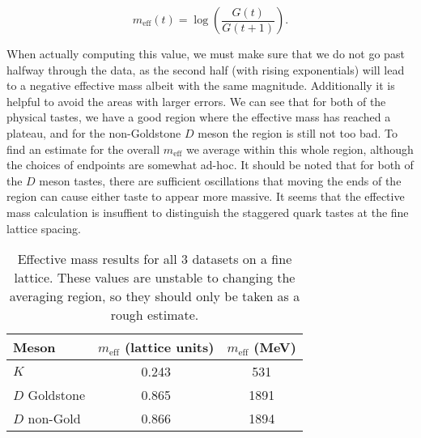 \documentclass[a4paper,12pt]{article}
\begin{document}
\begin{equation}
    \label{eq:meff}
    m_{\mathrm{eff}}(t) = \log(\frac{G(t)}{G(t+1)}).
\end{equation}

When actually computing this value, we must make sure that we do not go past halfway through the data, as the second half (with rising exponentials) will lead to a negative effective mass albeit with the same magnitude. Additionally it is helpful to avoid the areas with larger errors. We can see that for both of the physical tastes, we have a good region where the effective mass has reached a plateau, and for the non-Goldstone $D$ meson the region is still not too bad. To find an estimate for the overall $m_\mathrm{eff}$ we average within this whole region, although the choices of endpoints are somewhat ad-hoc. It should be noted that for both of the $D$ meson tastes, there are sufficient oscillations that moving the ends of the region can cause either taste to appear more massive. It seems that the effective mass calculation is insuffient to distinguish the staggered quark tastes at the fine lattice spacing.

\begin{figure}[!h]
\end{figure}

\begin{table}
\centering
\begin{tabular}{l S[table-format=1.2] S[table-format=4]}
    Meson               & {$m_\mathrm{eff}$ (lattice units)}    & {$m_\mathrm{eff}$ (\si{MeV})} \\
    \midrule
    $K$                 & 0.243                 & 531\\
    $D$ Goldstone       & 0.865                 & 1891\\
    $D$ non-Gold        & 0.866                 & 1894
\end{tabular}
\caption{Effective mass results for all 3 datasets on a fine lattice. These values are unstable to changing the averaging region, so they should only be taken as a rough estimate.}
\end{table}
\end{document}
